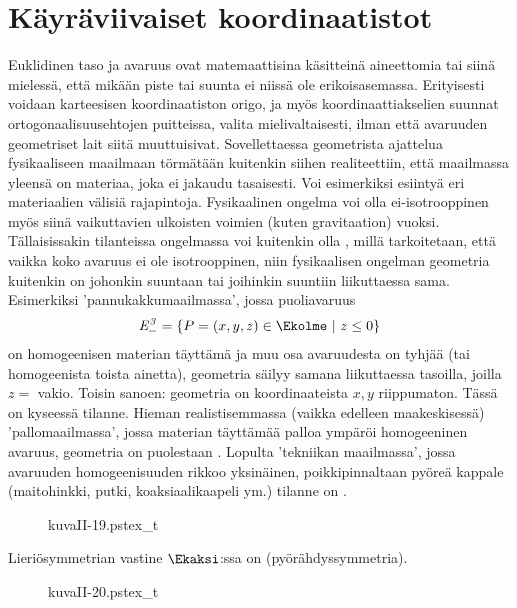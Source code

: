 \section{Käyräviivaiset koordinaatistot} \label{koordinaatistot}
\alku
{}

Euklidinen taso ja avaruus ovat matemaattisina käsitteinä aineettomia tai  
siinä mielessä, että mikään piste tai suunta ei niissä ole erikoisasemassa. Erityisesti voidaan
karteesisen koordinaatiston origo, ja myös koordinaattiakselien suunnat 
ortogonaalisuusehtojen puitteissa, valita mielivaltaisesti, ilman että avaruuden geometriset 
lait siitä muuttuisivat. Sovellettaessa geometrista ajattelua fysikaaliseen maailmaan törmätään
kuitenkin siihen realiteettiin, että maailmassa yleensä on materiaa, joka ei jakaudu tasaisesti.
Voi esimerkiksi esiintyä eri materiaalien välisiä rajapintoja. Fysikaalinen ongelma voi olla
ei-isotrooppinen myös siinä vaikuttavien ulkoisten voimien (kuten gravitaation) vuoksi. 
Tällaisissakin tilanteissa ongelmassa voi kuitenkin olla , millä tarkoitetaan,
että vaikka koko avaruus ei ole isotrooppinen, niin fysikaalisen ongelman geometria kuitenkin on
johonkin suuntaan tai joihinkin suuntiin liikuttaessa sama. Esimerkiksi 'pannukakkumaailmassa',
jossa puoliavaruus
\[
\mathit{E}_-^{\mathit{3}} = \{P=(x,y,z) \in \Ekolme \ | \ z \leq 0 \}
\]
on homogeenisen materian täyttämä ja muu osa avaruudesta on tyhjää (tai homogeenista toista 
ainetta), geometria säilyy samana liikuttaessa tasoilla, joilla $z=$ vakio. Toisin sanoen: 
geometria on koordinaateista $x,y$ riippumaton. Tässä on kyseessä  tilanne.
Hieman realistisemmassa (vaikka edelleen maakeskisessä) 'pallomaailmassa', jossa materian 
täyttämää palloa ympäröi homogeeninen avaruus, geometria on puolestaan .
Lopulta 'tekniikan maailmassa', jossa avaruuden homogeenisuuden rikkoo yksinäinen, 
poikkipinnaltaan pyöreä kappale (maitohinkki, putki, koaksiaalikaapeli ym.) tilanne on 
.
\begin{figure}[H]
\begin{center}
{kuvaII-19.pstex_t}
\end{center}
\end{figure}
Lieriösymmetrian vastine $\Ekaksi$:ssa on  (pyörähdyssymmetria).
\begin{figure}[H]
\begin{center}
{kuvaII-20.pstex_t}
\end{center}
\end{figure}
